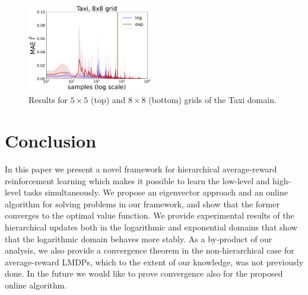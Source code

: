 \begin{figure}[!hb]
\begin{center}
        \includegraphics*[width=0.49\textwidth]{figures/chapter2/online/taxi_8_gammas_1.png}
        \caption{Results for $5 \times 5$ (top) and $8 \times 8$ (bottom) grids of the Taxi domain.}
          \label{fig:halmdps_taxi}
    \end{center}
  \end{figure}





\section{Conclusion}

In this paper we present a novel framework for hierarchical average-reward reinforcement learning which makes it possible to learn the low-level and high-level tasks simultaneously. 
We propose an eigenvector approach and an online algorithm for solving problems in our framework, and show that the former converges to the optimal value function. We provide experimental results of the hierarchical updates both in the logarithmic and exponential domains that show that the logarithmic domain behaves more stably.
As a by-product of our analysis, we also provide a convergence theorem in the non-hierarchical case for average-reward LMDPs, which to the extent of our knowledge, was not previously done. In the future we would like to prove convergence also for the proposed online algorithm.
